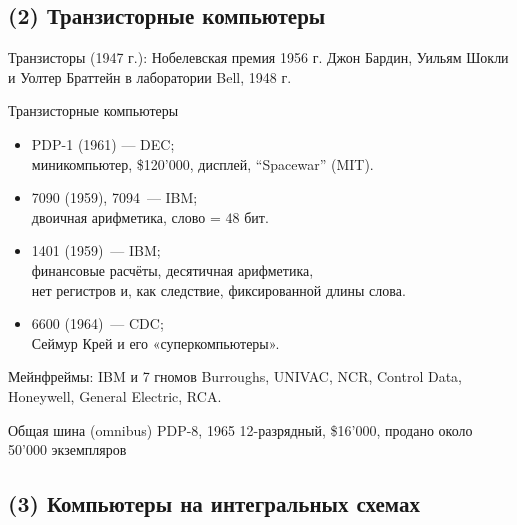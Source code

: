 \subsection {(2) Транзисторные компьютеры}

\begin{frame}{Транзисторы (1947 г.): Нобелевская премия 1956 г.}
\vspace{-.3cm}\small Джон Бардин, Уильям Шокли и Уолтер Браттейн в лаборатории Bell, 1948 г.
\end{frame}

\begin{frame}{Транзисторные компьютеры}
\pause
\begin{itemize}[<+->]
    \item PDP-1 (1961) — DEC;\\
        {\small миникомпьютер, \$120'000, дисплей, “Spacewar” (MIT).}

    \item 7090 (1959), 7094~— IBM;\\
        {\small двоичная арифметика, слово = $48$ бит.}

    \item 1401 (1959)~— IBM;\\
        {\small финансовые расчёты, десятичная арифметика,\\
        нет регистров и, как следствие, фиксированной длины слова.}

    \item 6600 (1964)~— CDC;\\
        {\small Сеймур Крей и его «суперкомпьютеры».}
\end{itemize}

\pause
\begin{block}{Мейнфреймы: IBM и 7 гномов}
Burroughs, UNIVAC, NCR, Control Data, Honeywell, General Electric, RCA.
\end{block}
\end{frame}

\begin{frame}{Общая шина (omnibus) PDP-8, 1965}
12-разрядный, \$16'000, продано около 50'000 экземпляров
\end{frame}

\subsection {(3) Компьютеры на интегральных схемах}

